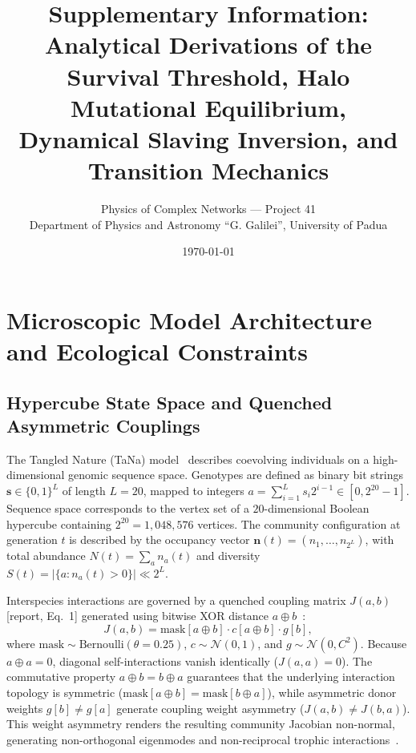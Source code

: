 \documentclass[11pt,a4paper]{article}
\title{\textbf{Supplementary Information: Analytical Derivations of the Survival Threshold, Halo Mutational Equilibrium, Dynamical Slaving Inversion, and Transition Mechanics}}
\author{Physics of Complex Networks --- Project 41\\Department of Physics and Astronomy ``G. Galilei'', University of Padua}
\date{\today}
\newcommand{\R}[1]{\textcolor{blue!55!black}{[report, #1]}}
\begin{document}
\maketitle

\tableofcontents

\newpage

\section{Microscopic Model Architecture and Ecological Constraints}
\label{sec:setup}

\subsection{Hypercube State Space and Quenched Asymmetric Couplings}

The Tangled Nature (TaNa) model~\cite{christensen2002tangled,anderson2004tangled,becker2014evolution,jensen2019tangled} describes coevolving individuals on a high-dimensional genomic sequence space. Genotypes are defined as binary bit strings $\mathbf{s} \in \{0,1\}^L$ of length $L = 20$, mapped to integers $a = \sum_{i=1}^L s_i 2^{i-1} \in [0, 2^{20}-1]$. Sequence space corresponds to the vertex set of a $20$-dimensional Boolean hypercube containing $2^{20} = 1{,}048{,}576$ vertices. The community configuration at generation $t$ is described by the occupancy vector $\mathbf{n}(t) = (n_1, \dots, n_{2^L})$, with total abundance $N(t) = \sum_a n_a(t)$ and diversity $S(t) = |\{a : n_a(t) > 0\}| \ll 2^L$.

Interspecies interactions are governed by a quenched coupling matrix $J(a,b)$ \R{Eq.~1} generated using bitwise XOR distance $a \oplus b$~\cite{rudyarthur-tnm}:
\begin{equation}
J(a,b) = \mathrm{mask}[a \oplus b] \cdot c[a \oplus b] \cdot g[b],
\label{eq:J_supp2}
\end{equation}
where $\mathrm{mask} \sim \mathrm{Bernoulli}(\theta = 0.25)$, $c \sim \mathcal{N}(0, 1)$, and $g \sim \mathcal{N}(0, C^2)$. Because $a \oplus a = 0$, diagonal self-interactions vanish identically ($J(a,a) = 0$). The commutative property $a \oplus b = b \oplus a$ guarantees that the underlying interaction topology is symmetric ($\mathrm{mask}[a \oplus b] = \mathrm{mask}[b \oplus a]$), while asymmetric donor weights $g[b] \neq g[a]$ generate coupling weight asymmetry ($J(a,b) \neq J(b,a)$). This weight asymmetry renders the resulting community Jacobian non-normal, generating non-orthogonal eigenmodes and non-reciprocal trophic interactions~\cite{trefethen2005spectra}.
\end{document}
